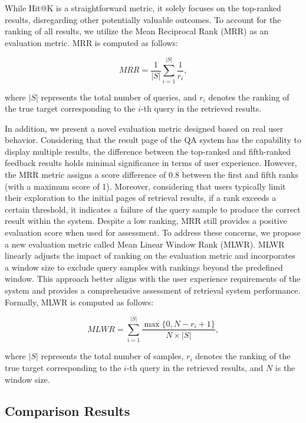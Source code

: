 \documentclass[mathematics,article,submit,moreauthors]{Definitions/mdpi}
\newcommand{\1}[1]{\mathds{1}\left[#1\right]}
\begin{document}
While Hit@K is a straightforward metric, it solely focuses on the top-ranked results, disregarding other potentially valuable outcomes. To account for the ranking of all results, we utilize the Mean Reciprocal Rank (MRR) as an evaluation metric. MRR is computed as follows:
\begin{linenomath}
	\begin{equation}\label{eq:mrr}
		MRR = \frac{1}{|S|}\sum_{i=1}^{|S|}\frac{1}{r_i}, 
	\end{equation}
\end{linenomath}
where $|S|$ represents the total number of queries, and $r_i$ denotes the ranking of the true target corresponding to the $i$-th query in the retrieved  results.

In addition, we present a novel evaluation metric designed based on real user behavior. Considering that the result page of the QA system  has the capability to display multiple results, the difference between the top-ranked and fifth-ranked feedback results holds minimal significance in terms of user experience. However, the MRR metric assigns a score difference of 0.8 between the first and fifth ranks (with a maximum score of 1). 
Moreover, considering that users typically limit their exploration to the initial pages of retrieval results, if a rank exceeds a certain threshold, it indicates a failure of the query sample to produce the correct result within the system. Despite a low ranking, MRR still provides a positive evaluation score when used for assessment. To address these concerns, we propose a new evaluation metric called Mean Linear Window Rank (MLWR). MLWR linearly adjusts the impact of ranking on the evaluation metric and incorporates a window size to exclude query samples with rankings beyond the predefined window. This approach better aligns with the user experience requirements of the system and provides a comprehensive assessment of retrieval system performance. Formally, MLWR is computed as follows:
\begin{linenomath}
	\begin{equation}\label{eq:mlwr}
		MLWR = \sum_{i=1}^{|S|}\frac{\max\{0, N-r_i+1\}}{N\times |S|}, 
	\end{equation}
\end{linenomath}
where $|S|$ represents the total number of samples, $r_i$ denotes the ranking of the true target corresponding to the $i$-th query in the retrieved  results, and $N$ is the window size. 

\subsection{Comparison Results}
\end{document}
